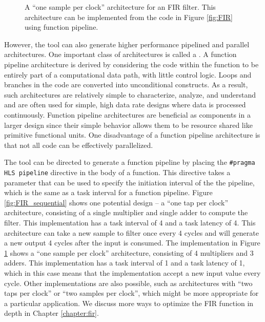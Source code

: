 \begin{figure}
\centering
\mbox{}

\mbox{}
\caption{A ``one sample per clock'' architecture for an FIR filter.  This architecture can be implemented from the code in Figure \ref{fig:FIR} using function pipeline.}\label{fig:FIR_function_pipeline}
\end{figure}

However, the \VHLS tool can also generate higher performance pipelined and parallel architectures.  One important class of architectures is called a .  A function pipeline architecture is derived by considering the code within the function to be entirely part of a computational data path, with little control logic.  Loops and branches in the code are converted into unconditional constructs.  As a result, such architectures are relatively simple to characterize, analyze, and understand and are often used for simple, high data rate designs where data is processed continuously.  Function pipeline architectures are beneficial as components in a larger design since their simple behavior allows them to be resource shared like primitive functional units.  One disadvantage of a function pipeline architecture is that not all code can be effectively parallelized.

The \VHLS tool can be directed to generate a function pipeline by placing the \lstinline|#pragma HLS pipeline| directive in the body of a function.  This directive takes a parameter that can be used to specify the initiation interval of the the pipeline, which is the same as a task interval for a function pipeline.  Figure \ref{fig:FIR_sequential} shows one potential design -- a ``one tap per clock'' architecture, consisting of a single multiplier and single adder to compute the filter.  This implementation has a task interval of 4 and a task latency of 4.  This architecture can take a new sample to filter once every 4 cycles and will generate a new output 4 cycles after the input is consumed. The implementation in Figure \ref{fig:FIR_function_pipeline} shows a ``one sample per clock'' architecture, consisting of 4 multipliers and 3 adders.  This implementation has a task interval of 1 and a task latency of 1, which in this case means that the implementation accept a new input value every cycle. Other implementations are also possible, such as architectures with ``two taps per clock'' or ``two samples per clock'', which might be more appropriate for a particular application.   We discuss more ways to optimize the FIR function in depth in Chapter \ref{chapter:fir}. 

